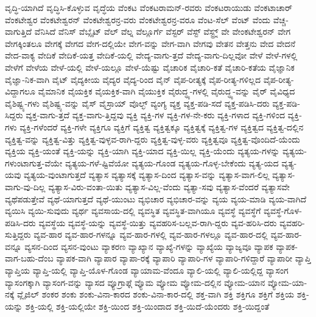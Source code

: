 {ವೃದ್ಧಿ-ಯಾಗಿದೆ
ವೃದ್ಧಿಸಿ-ಕೊಳ್ಳುವ
ವೃದ್ಧೆಯ
ವೆಂಕಟ
ವೆಂಕಟರಾಮನ್-ರವರು
ವೆಂಕಟರಾಯುಡು
ವೆಂಕಟಾಚಾರ್
ವೆಂಕಟೇಶ್ವರ
ವೆಂಕಟೇಶ್ವರನ್
ವೆಂಕಟೇಶ್ವರನ್ರ-ವರು
ವೆಂಕಟೇಶ್ವರನ್ರ-ವರೂ
ವೆಂಟ-ಸೆಲ್
ವೆಂಟ್
ವೆಂದು
ವೆಚ್ಚ-ವಾಗುತ್ತಿದೆ
ವೆನಿಸಿದೆ
ವೆನಿಸ್
ವೆಬ್ಸೈಟ್
ವೆಲ್
ವೆಲ್ನ
ವೆಲ್ಲೂರ್ಗೆ
ವೆಸ್ಟರ್
ವೆಸ್ಟ್
ವೆಸ್ಟ್ರ್ನ್
ವೇ
ವೇಂಕಟೇಶ್ವರನ್
ವೇಗ
ವೇಗಕ್ಕಿಂತಲೂ
ವೇಗಕ್ಕೆ
ವೇಗದ
ವೇಗ-ದಲ್ಲಿಯೇ
ವೇಗ-ವನ್ನು
ವೇಗ-ವಾಗಿ
ವೇಗವು
ವೇತನ
ವೇತ್ತನು
ವೇದ
ವೇದನೆ
ವೇದ-ವಾಕ್ಯ
ವೇದಿಕೆ
ವೇದಿಕೆ-ಯತ್ತ
ವೇದಿಕೆ-ಯಲ್ಲಿ
ವೇದ್ಯ-ವಾಗು-ತ್ತದೆ
ವೇದ್ಯ-ವಾಗು-ದಿಲ್ಲವೋ
ವೇಳೆ
ವೇಳೆ-ಗಳಲ್ಲಿ
ವೇಳೆಗೆ
ವೇಳೆಯ
ವೇಳೆ-ಯಲ್ಲಿ
ವೇಳೆ-ಯಲ್ಲೂ
ವೇಳೆ-ಯೆಷ್ಟು
ವೈಚಾರಿಕ
ವೈಚಾರಿ-ಕತೆ
ವೈಚಾರಿ-ಕತೆಯ
ವೈಜ್ಞಾನಿಕ
ವೈಜ್ಞಾ-ನಿಕ-ವಾಗಿ
ವೈಟ್
ವೈದ್ಯಕೀಯ
ವೈದ್ಯರ
ವೈದ್ಯ-ರಿಂದ
ವೈನ್
ವೈಪ-ರೀತ್ಯಕ್ಕೆ
ವೈಪ-ರೀತ್ಯ-ಗಳಿಲ್ಲದ
ವೈಪ-ರೀತ್ಯ-ವಿದ್ದಾಗಲೂ
ವೈಮಾನಿಕ
ವೈಯಕ್ತಿಕ
ವೈಯಕ್ತಿಕ-ವಾಗಿ
ವೈಯುಕ್ತಿಕ
ವೈರುದ್ಧ್ಯ-ಗಳಲ್ಲಿ
ವೈರುದ್ಧ್ಯ-ವನ್ನು
ವೈರ್
ವೈವಿಧ್ಯದ
ವೈಶಿಷ್ಟ್ಯ-ಗಳು
ವೈಶಿಷ್ಟ್ಯ-ವನ್ನು
ವೈಸ್
ವೈಸ್ರಾಯ್
ವೊಲ್ಛ್
ವ್ಯಂಗ್ಯ
ವ್ಯಕ್ತ
ವ್ಯಕ್ತ-ಪಡಿ-ಸದೆ
ವ್ಯಕ್ತ-ಪಡಿಸಿ-ದರು
ವ್ಯಕ್ತ-ಪಡಿ-ಸಿದ್ದರು
ವ್ಯಕ್ತ-ವಾಗು-ತ್ತದೆ
ವ್ಯಕ್ತ-ವಾಗು-ತ್ತಿದ್ದವು
ವ್ಯಕ್ತಿ
ವ್ಯಕ್ತಿ-ಗಳ
ವ್ಯಕ್ತಿ-ಗಳ-ನೇ-ಕರು
ವ್ಯಕ್ತಿ-ಗಳಾದ
ವ್ಯಕ್ತಿ-ಗಳಿಂದ
ವ್ಯಕ್ತಿ-ಗಳು
ವ್ಯಕ್ತಿ-ಗಳೆಂದರೆ
ವ್ಯಕ್ತಿ-ಗಳೇ
ವ್ಯಕ್ತಿಗೂ
ವ್ಯಕ್ತಿಗೆ
ವ್ಯಕ್ತಿತ್ವ
ವ್ಯಕ್ತಿತ್ವಕ್ಕೂ
ವ್ಯಕ್ತಿತ್ವಕ್ಕೆ
ವ್ಯಕ್ತಿತ್ವ-ಗಳ
ವ್ಯಕ್ತಿತ್ವದ
ವ್ಯಕ್ತಿತ್ವ-ದಲ್ಲಿನ
ವ್ಯಕ್ತಿತ್ವ-ವನ್ನು
ವ್ಯಕ್ತಿತ್ವ-ವಿತ್ತು
ವ್ಯಕ್ತಿತ್ವ-ವುಳ್ಳವ-ರಾಗಿ-ದ್ದರು
ವ್ಯಕ್ತಿತ್ವ-ವುಳ್ಳ-ವರು
ವ್ಯಕ್ತಿತ್ವವೂ
ವ್ಯಕ್ತಿತ್ವ-ವೊಂದಿದೆ-ಯೆಂದು
ವ್ಯಕ್ತಿಯ
ವ್ಯಕ್ತಿ-ಯಂತೆ
ವ್ಯಕ್ತಿ-ಯನ್ನು
ವ್ಯಕ್ತಿ-ಯಾಗಿ
ವ್ಯಕ್ತಿ-ಯಾದ
ವ್ಯಕ್ತಿ-ಯಿಲ್ಲ
ವ್ಯಕ್ತಿ-ಯೆಂದು
ವ್ಯತ್ಯಯ-ಗಳನ್ನು
ವ್ಯತ್ಯಯ-ಗಳುಂಟಾಗುತ್ತ-ವೆಯೇ
ವ್ಯತ್ಯಯ-ಗಳೆ-ಷ್ಟಿವೆಯೋ
ವ್ಯತ್ಯಯ-ಗೊಂಡ
ವ್ಯತ್ಯಯ-ಗೊಳ್ಳ-ಬೇಕೆಂದು
ವ್ಯತ್ಯ-ಯದ
ವ್ಯತ್ಯ-ಯವು
ವ್ಯತ್ಯಯ-ವುಂಟಾಗುತ್ತದೆ
ವ್ಯತ್ಯಾಸ
ವ್ಯತ್ಯಾಸಕ್ಕೆ
ವ್ಯತ್ಯಾಸ-ದಿಂದ
ವ್ಯತ್ಯಾಸ-ವನ್ನು
ವ್ಯತ್ಯಾಸ-ವಾಗ-ಲಿಲ್ಲ
ವ್ಯತ್ಯಾಸ-ವಾಗು-ವು-ದಿಲ್ಲ
ವ್ಯತ್ಯಾಸ-ವಿರು-ವಂತಾ-ಯಿತು
ವ್ಯತ್ಯಾಸ-ವಿಲ್ಲ-ವೆಂದು
ವ್ಯತ್ಯಾ-ಸವು
ವ್ಯತ್ಯಾಸ-ವೆಂದರೆ
ವ್ಯತ್ಯಾಸವೇ
ವ್ಯಥೆಪಡುತ್ತೇವೆ
ವ್ಯಥೆ-ಯಾಗುತ್ತದೆ
ವ್ಯಥೆ-ಯುಂಟು
ವ್ಯಭಿಚಾರ
ವ್ಯಭಿಚಾರ-ವನ್ನು
ವ್ಯಯ
ವ್ಯಯ-ಮಾಡಿ
ವ್ಯಯ-ವಾಗಿದೆ
ವ್ಯಯಿಸಿ
ವ್ಯಯಿ-ಸುವುದು
ವ್ಯರ್ಥ
ವ್ಯವಸಾಯ-ದಲ್ಲಿ
ವ್ಯವಸ್ಥಿತ
ವ್ಯವಸ್ಥಿತ-ವಾಗಿಯೂ
ವ್ಯವಸ್ಥೆ
ವ್ಯವಸ್ಥೆಗೆ
ವ್ಯವಸ್ಥೆ-ಗೊಳ-ಪಡಿಸಿ-ದರು
ವ್ಯವಸ್ಥೆಯ
ವ್ಯವಸ್ಥೆ-ಯನ್ನು
ವ್ಯವಸ್ಥೆ-ಯಿತ್ತು
ವ್ಯವಹರಿಸ-ಬಲ್ಲವ-ರಾಗಿ-ದ್ದರು
ವ್ಯವ-ಹರಿಸಿ-ದರು
ವ್ಯವಹರಿ-ಸುತ್ತಿದ್ದರು
ವ್ಯವ-ಹಾರ
ವ್ಯವ-ಹಾರ-ಗಳನ್ನೂ
ವ್ಯವ-ಹಾರ-ಗಳಲ್ಲಿ
ವ್ಯವ-ಹಾರ-ಗಳಲ್ಲೂ
ವ್ಯವ-ಹಾರ-ದಲ್ಲಿ
ವ್ಯವ-ಹಾರ-ವನ್ನೂ
ವ್ಯಸನ-ದಿಂದ
ವ್ಯಸನ-ವುಂಟು
ವ್ಯಾಕರಣ
ವ್ಯಾಖ್ಯಾನ
ವ್ಯಾಖ್ಯೆ-ಗಳನ್ನು
ವ್ಯಾಖ್ಯೆಯ
ವ್ಯಾಜ್ಯವೂ
ವ್ಯಾಪಕ
ವ್ಯಾಪಕ-ವಾಗ-ಬಹು-ದೆಂಬ
ವ್ಯಾಪಕ-ವಾಗಿ
ವ್ಯಾಪಾರ
ವ್ಯಾಪಾ-ರಕ್ಕೆ
ವ್ಯಾಪಾರಿ
ವ್ಯಾಪಾರಿ-ಗಳ
ವ್ಯಾಪಾರಿ-ಗಳಿದ್ದಾರೆ
ವ್ಯಾಪಾರೀ
ವ್ಯಾಪ್ತಿ
ವ್ಯಾಪ್ತಿಯ
ವ್ಯಾಪ್ತಿ-ಯಲ್ಲಿ
ವ್ಯಾಪ್ತಿ-ಯೊಳ-ಗೊಂಡ
ವ್ಯಾಯಾಮ-ವೆಂದೂ
ವ್ಯಾಲಿ-ಯಲ್ಲಿ
ವ್ಯಾಲಿ-ಯಲ್ಲಿದ್ದ
ವ್ಯಾಸಂಗ
ವ್ಯಾಸಂಗಕ್ಕಾಗಿ
ವ್ಯಾಸಂಗ-ವನ್ನು
ವ್ಯಾಸದ
ವ್ಯೂಗ್ರಾಫ್ಗೆ
ವ್ಯೊಮ
ವ್ಯೋಮ
ವ್ಯೋಮ-ದಲ್ಲಿನ
ವ್ಯೋಮ-ಯಾನ
ವ್ಯೋಮ-ಯಾ-ನಕ್ಕೆ
ವ್ಲೈಜಿಲ್
ಶಂಕರ
ಶಂಕು
ಶಂಕು-ವಿನಾ-ಕಾರದ
ಶಂಕು-ವಿನಾ-ಕಾರ-ದಲ್ಲಿ
ಶಕ್ತ-ವಾಗಿ
ಶಕ್ತಿ
ಶಕ್ತಿಗೂ
ಶಕ್ತಿಗೆ
ಶಕ್ತಿಯ
ಶಕ್ತಿ-ಯನ್ನು
ಶಕ್ತಿ-ಯಲ್ಲಿ
ಶಕ್ತಿ-ಯಲ್ಲಿಯೇ
ಶಕ್ತಿ-ಯಿಂದ
ಶಕ್ತಿ-ಯಿಂದಾದ
ಶಕ್ತಿ-ಯಿದೆ-ಯೆಂದರು
ಶಕ್ತಿ-ಯಿದ್ದಂತೆ
}
